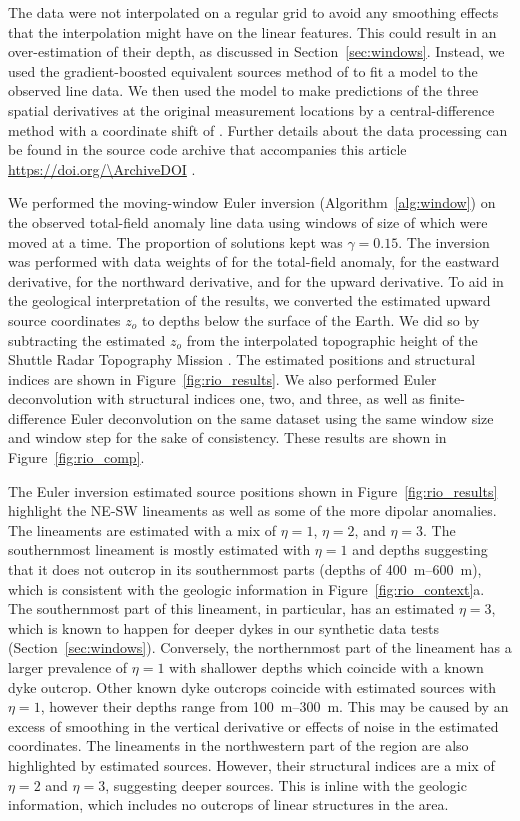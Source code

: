 The data were not interpolated on a regular grid to avoid any smoothing effects
that the interpolation might have on the linear features. This could result in
an over-estimation of their depth, as discussed in Section~\ref{sec:windows}.
Instead, we used the gradient-boosted equivalent sources method of
\citet{Soler2021} to fit a model to the observed line data.
We then used the model to make predictions of the three spatial derivatives at
the original measurement locations by a central-difference method with
a coordinate shift of \RioDerivSpacing{}. Further details about the data
processing can be found in the source code archive that accompanies this
article \url{https://doi.org/\ArchiveDOI} \citep{figshare}.

We performed the moving-window Euler inversion (Algorithm~\ref{alg:window}) on
the observed total-field anomaly line data using windows of size of
\RioWindowSize{} which were moved \RioWindowStep{} at a time. The proportion of
solutions kept was $\gamma=0.15$. The inversion was performed with data weights
of \RioWeightsF{} for the total-field anomaly, \RioWeightsE{} for the eastward
derivative, \RioWeightsN{} for the northward derivative, and \RioWeightsU{} for
the upward derivative.
To aid in the geological interpretation of the results, we converted the
estimated upward source coordinates $z_o$ to depths below the surface of the
Earth. We did so by subtracting the estimated $z_o$ from the interpolated
topographic height of the Shuttle Radar Topography Mission
\citep[SRTM;][]{SRTM}. The estimated positions and structural indices are shown
in Figure~\ref{fig:rio_results}.
We also performed Euler deconvolution with structural indices one, two, and
three, as well as finite-difference Euler deconvolution on the same dataset
using the same window size and window step for the sake of consistency.
These results are shown in Figure~\ref{fig:rio_comp}.

The Euler inversion estimated source positions shown in
Figure~\ref{fig:rio_results} highlight the NE-SW lineaments as well as some of
the more dipolar anomalies.
The lineaments are estimated with a mix of $\eta=1$, $\eta=2$, and $\eta=3$.
The southernmost lineament is mostly estimated with $\eta=1$ and depths
suggesting that it does not outcrop in its southernmost parts (depths of
\qtyrange{400}{600}{\m}), which is consistent with the geologic information in
Figure~\ref{fig:rio_context}a. The southernmost part of this lineament, in
particular, has an estimated $\eta=3$, which is known to happen for deeper
dykes in our synthetic data tests (Section~\ref{sec:windows}). Conversely, the
northernmost part of the lineament has a larger prevalence of $\eta=1$ with
shallower depths which coincide with a known dyke outcrop.
Other known dyke outcrops coincide with estimated sources with $\eta=1$,
however their depths range from \qtyrange{100}{300}{\m}. This may be caused by
an excess of smoothing in the vertical derivative or effects of noise in the
estimated coordinates. The lineaments in the northwestern part of the region
are also highlighted by estimated sources.
However, their structural indices are a mix of $\eta=2$ and $\eta=3$,
suggesting deeper sources. This is inline with the geologic information, which
includes no outcrops of linear structures in the area.


